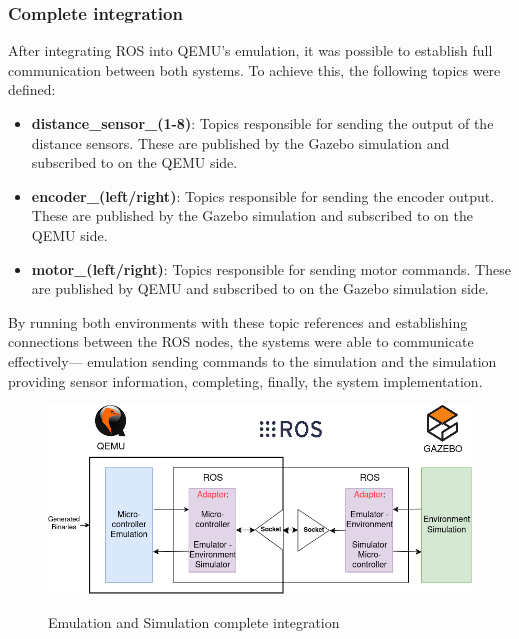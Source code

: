 \documentclass[../../monografia.tex]{subfiles}
\begin{document}
\subsubsection{Complete integration}

After integrating ROS into QEMU's emulation, it was possible to establish full communication between both systems. To achieve this, the following topics were defined:

\begin{itemize}
    \item \textbf{distance\_sensor\_(1-8)}: Topics responsible for sending the output of the distance sensors. These are published by the Gazebo simulation and subscribed to on the QEMU side.
    \item \textbf{encoder\_(left/right)}: Topics responsible for sending the encoder output. These are published by the Gazebo simulation and subscribed to on the QEMU side.
    \item \textbf{motor\_(left/right)}: Topics responsible for sending motor commands. These are published by QEMU and subscribed to on the Gazebo simulation side.
\end{itemize}

By running both environments with these topic references and establishing connections between the ROS nodes, the systems were able to communicate effectively— emulation sending commands to the simulation and the simulation providing sensor information, completing, finally, the system implementation.

\begin{figure}[h!]
    \caption{Emulation and Simulation complete integration}
    \centering
    \includegraphics[width=16cm]{src/images/complete_integration.png}
    \label{fig: Emulation and Simulation complete integration}
\end{figure}




\end{document}
